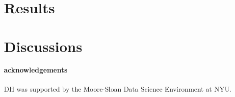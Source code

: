 \documentclass[12pt]{emulateapj}
\begin{document}
\section{Results}


\section{Discussions}



\paragraph{acknowledgements}
DH was supported by the Moore-Sloan Data Science Environment at NYU. 



\end{document}
